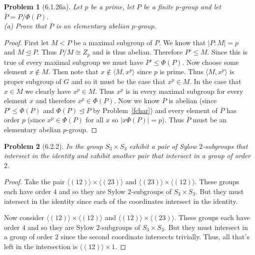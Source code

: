 \documentclass{article}
\newtheorem{problem}{Problem}
\newcommand{\normal}{\unlhd}
\begin{document}
\begin{problem}[6.1.26a]
Let $p$ be a prime, let $P$ be a finite $p$-group and let $\overline{P} = P/\Phi(P)$.\\
(a) Prove that $\overline{P}$ is an elementary abelian $p$-group.
\end{problem}
\begin{proof}
First let $M < P$ be a maximal subgroup of $P$. We know that $|P : M| = p$ and $M \normal P$. Thus $P/M \cong Z_p$ and is thus abelian. Therefore $P' \leq M$. Since this is true of every maximal subgroup we must have $P' \leq \Phi(P)$. Now choose some element $x \notin M$. Then note that $x \notin \langle M , x^p \rangle$ since $p$ is prime. Thus $\langle M, x^p \rangle$ is proper subgroup of $G$ and so it must be the case that $x^p \in M$. In the case that $x \in M$ we clearly have $x^p \in M$. Thus $x^p$ is in every maximal subgroup for every element $x$ and therefore $x^p \in \Phi(P)$. Now we know $\overline{P}$ is abelian (since $P' \leq \Phi(P)$ and $\Phi(P) \normal P$ by Problem~\ref{fchar}) and every element of $\overline{P}$ has order $p$ (since $x^p \in \Phi(P)$ for all $x$ so $|x\Phi(P)| = p$). Thus $\overline{P}$ must be an elementary abelian $p$-group.
\end{proof}

\begin{problem}[6.2.2]
In the group $S_3 \times S_3$ exhibit a pair of Sylow $2$-subgroups that intersect in the identity and exhibit another pair that intersect in a group of order $2$.
\end{problem}
\begin{proof}
Take the pair $\langle (12) \rangle \times \langle (23) \rangle$ and $\langle (23) \rangle \times \langle (12) \rangle$. These groups each have order $4$ and so they are Sylow $2$-subgroups of $S_3 \times S_3$. But they must intersect in the identity since each of the coordinates intersect in the identity.

Now consider $\langle (12) \rangle \times \langle (12) \rangle$ and $\langle (12) \rangle \times \langle (23) \rangle$. These groups each have order $4$ and so they are Sylow $2$-subgroups of $S_3 \times S_3$. But they must intersect in a group of order $2$ since the second coordinate intersects trivially. Thus, all that's left in the intersection is $\langle (12) \rangle \times 1$.
\end{proof}
\end{document}
